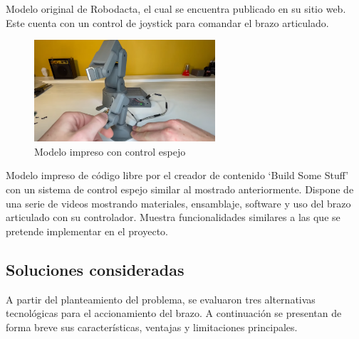 Modelo original de Robodacta, el cual se encuentra publicado en su sitio web. Este cuenta con un control de joystick para comandar el brazo articulado.

\begin{figure}[H]
  \centering
  \includegraphics[width=0.6\textwidth]{anexos/inspiraciones/10impreso.png}
  \caption{Modelo impreso con control espejo}\label{fig:insp.impreso}
\end{figure}

Modelo impreso de código libre por el creador de contenido `Build Some Stuff' con un sistema de control espejo similar al mostrado anteriormente. Dispone de una serie de videos mostrando materiales, ensamblaje, software y uso del brazo articulado con su controlador. Muestra funcionalidades similares a las que se pretende implementar en el proyecto.




\subsection{Soluciones consideradas}
A partir del planteamiento del problema, se evaluaron tres alternativas tecnológicas para el accionamiento del brazo. A continuación se presentan de forma breve sus características, ventajas y limitaciones principales.

